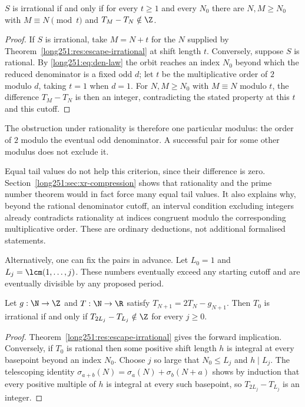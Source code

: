 \begin{theorem}\label{long251:res:freepair}
$S$ is irrational if and only if for every $t\ge1$ and every $N_0$ there are
$N,M\ge N_0$ with $M\equiv N\pmod t$ and $T_M-T_N\notin\Z$.
\end{theorem}

\begin{proof}
If $S$ is irrational, take $M=N+t$ for the $N$ supplied by
Theorem~\ref{long251:res:escape-irrational} at shift length $t$.  Conversely, suppose
$S$ is rational.  By \eqref{long251:eq:den-law} the orbit reaches an index $N_0$ beyond
which the reduced denominator is a fixed odd $d$; let $t$ be the
multiplicative order of $2$ modulo $d$, taking $t=1$ when $d=1$.  For $N,M\ge N_0$ with $M\equiv N$
modulo $t$, the difference $T_M-T_N$ is then an integer, contradicting the
stated property at this $t$ and this cutoff.
\end{proof}

The obstruction under rationality is therefore one particular modulus:
the order of $2$ modulo the eventual odd denominator.  A successful
pair for some other modulus does not exclude it.

Equal tail values do not help this criterion, since their difference is
zero.  Section~\ref{long251:sec:xr-compression} shows that rationality and
the prime number theorem would in fact force many equal tail values.
It also explains why, beyond the rational denominator cutoff, an interval
condition excluding integers already contradicts rationality at indices
congruent modulo the corresponding multiplicative order.  These are
ordinary deductions, not additional formalised statements.

Alternatively, one can fix the pairs in advance.  Let $L_0=1$ and
$L_j=\lcm(1,\ldots,j)$.  These numbers eventually exceed any starting
cutoff and are eventually divisible by any proposed period.

\begin{theorem}\label{long251:res:lcmdiagonal}
Let $g:\N\to\Z$ and $T:\N\to\R$ satisfy $T_{N+1}=2T_N-g_{N+1}$.  Then
$T_0$ is irrational if and only if
$T_{2L_j}-T_{L_j}\notin\Z$ for every $j\ge0$.
\end{theorem}

\begin{proof}
Theorem~\ref{long251:res:escape-irrational} gives the forward implication.  Conversely,
if $T_0$ is rational then some positive shift length $h$ is integral at every
basepoint beyond an index $N_0$.  Choose $j$ so large that $N_0\le L_j$ and
$h\mid L_j$.  The telescoping identity
$\sigma_{a+b}(N)=\sigma_a(N)+\sigma_b(N+a)$ shows by induction that every
positive multiple of $h$ is integral at every such basepoint, so
$T_{2L_j}-T_{L_j}$ is an integer.
\end{proof}

